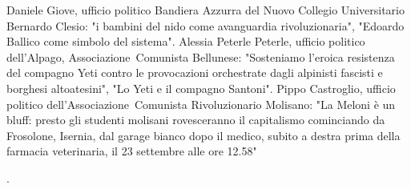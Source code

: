 \documentclass{article}
\begin{document}
\begin{multicols}{3}Daniele Giove, ufficio politico Bandiera Azzurra del Nuovo Collegio Universitario Bernardo Clesio: "i bambini del nido come avanguardia rivoluzionaria", "Edoardo Ballico come simbolo del sistema".
\vfill\null
\columnbreak 
Alessia Peterle Peterle, ufficio politico dell'Alpago, Associazione\texttrademark\ Comunista Bellunese: "Sosteniamo l'eroica resistenza del compagno Yeti contro le provocazioni orchestrate dagli alpinisti fascisti e borghesi altoatesini", "Lo Yeti e il compagno Santoni".
\vfill\null
\columnbreak
Pippo Castroglio, ufficio politico dell'Associazione\texttrademark\ Comunista Rivoluzionario Molisano: "La Meloni è un bluff: presto gli studenti molisani rovesceranno il capitalismo cominciando da Frosolone, Isernia, dal garage bianco dopo il medico, subito a destra prima della farmacia veterinaria, il 23 settembre alle ore 12.58"
\end{multicols}.
\end{document}
